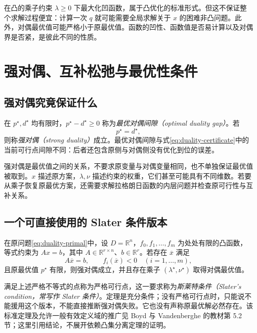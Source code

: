\documentclass[UTF8,12pt,a4paper,fontset=fandol]{ctexart}
\begin{document}
在凸的乘子约束 $\lambda\geq0$ 下最大化凹函数，属于凸优化的标准形式。但这不保证整个求解过程便宜：计算一次 $q$ 就可能需要全局求解关于 $x$ 的困难非凸问题。此外，对偶最优值可能严格小于原最优值。函数的凹性、函数值是否易计算以及对偶界是否紧，是彼此不同的性质。

\section{强对偶、互补松弛与最优性条件}
\label{sec:duality-strong}

\subsection{强对偶究竟保证什么}

在 $p^\star,d^\star$ 均有限时，$p^\star-d^\star\geq0$ 称为\emph{最优对偶间隙（optimal duality gap）}。若
\begin{equation}
 p^\star=d^\star,
 \label{eq:duality-strong}
\end{equation}
则称\emph{强对偶（strong duality）}成立。最优对偶间隙与式\eqref{eq:duality-certificate}中的当前可行点间隙不同：后者还包含原侧与对偶侧没有优化到位的误差。

强对偶是最优值之间的关系，不要求原变量与对偶变量相同，也不单独保证最优值被取到。$x$ 描述原方案，$\lambda,\nu$ 描述约束的权重，它们甚至可能具有不同维数。若要从乘子恢复原最优方案，还需要求解拉格朗日函数的内层问题并检查原可行性与互补关系。

\subsection{一个可直接使用的 Slater 条件版本}

\begin{theorem}
\label{thm:duality-slater}
在原问题\eqref{eq:duality-primal}中，设 $D=\mathbb R^n$，$f_0,f_1,\ldots,f_m$ 为处处有限的凸函数，等式约束为 $Ax=b$，其中 $A\in\mathbb R^{r\times n}$、$b\in\mathbb R^r$。若存在 $\overline x$ 满足
\[
 A\overline x=b,
 \qquad f_i(\overline x)<0\quad(i=1,\ldots,m),
\]
且原最优值 $p^\star$ 有限，则强对偶成立，并且存在乘子 $(\lambda^\star,\nu^\star)$ 取得对偶最优值。
\end{theorem}

满足上述严格不等式的点称为严格可行点，这一要求称为\emph{斯莱特条件（Slater's condition，常写作 Slater 条件）}。定理是充分条件；没有严格可行点时，只能说不能援用这个版本，不能直接推断强对偶失败。它也没有声称原最优解必然存在。该标准定理及允许一般有效定义域的推广见 Boyd 与 Vandenberghe 的教材第 5.2 节\cite{boyd-vandenberghe}；这里引用结论，不展开依赖凸集分离定理的证明。
\end{document}
